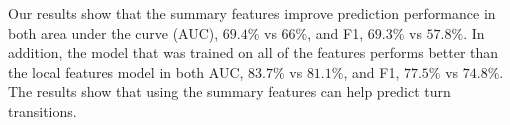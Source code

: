 Our results show that the summary features improve prediction performance in both area under the curve (AUC), $69.4\%$ vs $66\%$, and F1, $69.3\%$ vs $57.8\%$. In addition, the model that was trained on all of the features performs better than the local features model in both AUC, $83.7\%$ vs $81.1\%$, and F1, $77.5\%$ vs $74.8\%$. The results show that using the summary features can help predict turn transitions.

